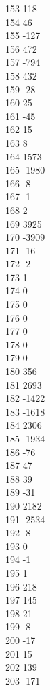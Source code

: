 { 153	118 \\
 154	46 \\
 155	-127 \\
 156	472 \\
 157	-794 \\
 158	432 \\
 159	-28 \\
 160	25 \\
 161	-45 \\
 162	15 \\
 163	8 \\
 164	1573 \\
 165	-1980 \\
 166	-8 \\
 167	-1 \\
 168	2 \\
 169	3925 \\
 170	-3909 \\
 171	-16 \\
 172	-2 \\
 173	1 \\
 174	0 \\
 175	0 \\
 176	0 \\
 177	0 \\
 178	0 \\
 179	0 \\
 180	356 \\
 181	2693 \\
 182	-1422 \\
 183	-1618 \\
 184	2306 \\
 185	-1934 \\
 186	-76 \\
 187	47 \\
 188	39 \\
 189	-31 \\
 190	2182 \\
 191	-2534 \\
 192	-8 \\
 193	0 \\
 194	-1 \\
 195	1 \\
 196	218 \\
 197	145 \\
 198	21 \\
 199	-8 \\
 200	-17 \\
 201	15 \\
 202	139 \\
 203	-171 \\
}
